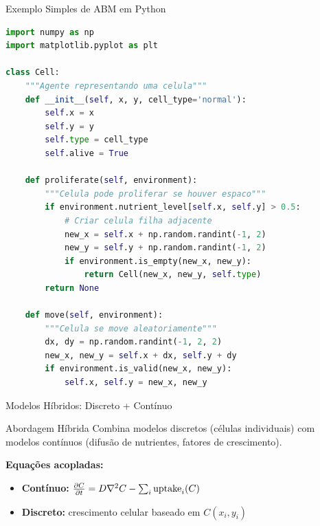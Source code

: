 \begin{frame}[fragile]{Exemplo Simples de ABM em Python}
\begin{lstlisting}[language=Python, caption=Agent-Based Model básico, basicstyle=\ttfamily\footnotesize]
import numpy as np
import matplotlib.pyplot as plt

class Cell:
    """Agente representando uma celula"""
    def __init__(self, x, y, cell_type='normal'):
        self.x = x
        self.y = y
        self.type = cell_type
        self.alive = True

    def proliferate(self, environment):
        """Celula pode proliferar se houver espaco"""
        if environment.nutrient_level[self.x, self.y] > 0.5:
            # Criar celula filha adjacente
            new_x = self.x + np.random.randint(-1, 2)
            new_y = self.y + np.random.randint(-1, 2)
            if environment.is_empty(new_x, new_y):
                return Cell(new_x, new_y, self.type)
        return None

    def move(self, environment):
        """Celula se move aleatoriamente"""
        dx, dy = np.random.randint(-1, 2, 2)
        new_x, new_y = self.x + dx, self.y + dy
        if environment.is_valid(new_x, new_y):
            self.x, self.y = new_x, new_y
\end{lstlisting}
\end{frame}

\begin{frame}{Modelos Híbridos: Discreto + Contínuo}
\begin{block}{Abordagem Híbrida}
Combina modelos discretos (células individuais) com modelos contínuos (difusão de nutrientes, fatores de crescimento).
\end{block}

\begin{center}
\end{center}

\textbf{Equações acopladas:}
\begin{itemize}
    \item \textbf{Contínuo:} $\frac{\partial C}{\partial t} = D\nabla^2 C - \sum_i \text{uptake}_i(C)$
    \item \textbf{Discreto:} crescimento celular baseado em $C(x_i, y_i)$
\end{itemize}
\end{frame}

